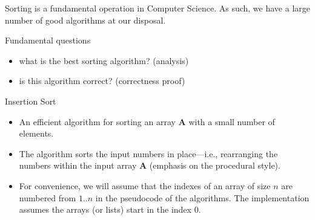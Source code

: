\begin{frame}
  Sorting is a fundamental operation in Computer Science. \pause As such,
  we have a large number of good algorithms at our disposal. \pause

  \begin{block}{Fundamental questions}
   \begin{itemize}
   \item what is the best sorting algorithm? (analysis)
   \item is this algorithm correct? (correctness proof)
   \end{itemize}  
  \end{block}
\end{frame}


\begin{frame}{Insertion Sort}
  
  \begin{itemize}
  \item An efficient algorithm for sorting an array {\bf A} with a
    {\color{blue}small number of elements}. \pause

  \item The algorithm sorts the input numbers in place---i.e., rearranging the
    numbers within the input array {\bf A} (emphasis on the procedural style). \pause 

  \item For convenience, we will assume that the indexes of an array of size $n$ are numbered
    from $1 .. n$ in the pseudocode of the algorithms. \pause The implementation assumes
    the arrays (or lists) start in the index $0$.   
  \end{itemize}
\end{frame}

